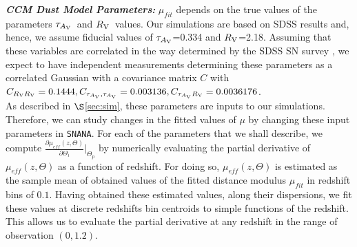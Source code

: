 \documentclass[preprint2]{aastex}    %
\newcommand\rv{$R_{\rm V}$}
\newcommand\tauav{$\tau_{A_{\rm V}}$}
\newcommand{\snana}{{\tt SNANA}}
\begin{document}
\noindent\textit{\textbf{CCM Dust Model Parameters:}} $\mu_{fit}$ 
depends on the true values of the 
parameters \tauav\ and \rv\ values. Our simulations are based on SDSS
results \citep{kes09}  and, hence, we assume fiducial values 
of \tauav=0.334 and \rv=2.18. 
Assuming that these variables are correlated in the way determined by 
the SDSS SN survey \citep{kes09}, we expect to have independent measurements 
determining these parameters as a correlated Gaussian with a covariance 
matrix $C$ with $C_{R_{\rm V}R_{\rm V}} = 0.1444, C_{\tau_{A_{\rm V}},\tau_{A_{\rm V}}} =0.003136,
C_{\tau_{A_{\rm V}}R_{\rm V}}= 0.0036176$.\\
 
As described in $\S$\ref{sec:sim}, these parameters are inputs to our simulations. Therefore, we can 
study changes in the fitted values of $\mu$ by changing these input parameters in \snana. 
For each of the parameters 
that we shall describe, we compute $\frac{\partial{\mu_{eff}(z,\Theta)}}{\partial \Theta_i}\vert_{\Theta_p}$ 
by numerically evaluating the partial 
derivative of $\mu_{eff}(z,\Theta)$ as a function of redshift. 
For doing so, $\mu_{eff}(z,\Theta)$ is estimated as the sample mean of 
obtained values of the fitted distance modulus $\mu_{fit}$ in redshift bins 
 of $0.1$. Having obtained these estimated values, along their dispersions, 
we fit these values at discrete redshifts bin centroids to simple functions of the redshift. This allows us to 
evaluate the partial derivative at any redshift in the range of 
observation $(0,1.2)$. 


\end{document}
